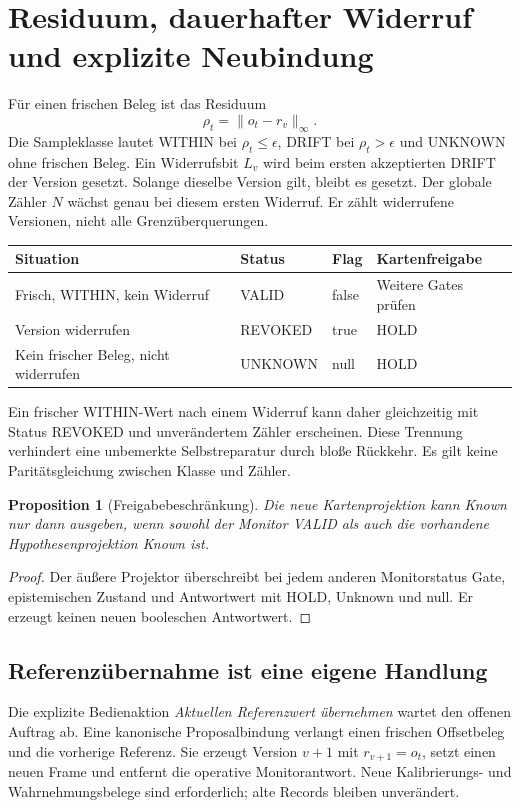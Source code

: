 \documentclass[11pt,a4paper]{article}
\newcommand{\nextsection}[2]{\clearpage{\color{accent}\small\textsf{#1}}\section{#2}}
\newtheorem{proposition}{Proposition}[section]
\begin{document}
\nextsection{53 / DRIFTMONITOR}{Residuum, dauerhafter Widerruf und explizite Neubindung}
Für einen frischen Beleg ist das Residuum
\[
 \rho_t=\|o_t-r_v\|_\infty.
\]
Die Sampleklasse lautet WITHIN bei $\rho_t\leq\epsilon$,
DRIFT bei $\rho_t>\epsilon$ und UNKNOWN ohne frischen Beleg.
Ein Widerrufsbit $L_v$ wird beim ersten akzeptierten DRIFT der
Version gesetzt. Solange dieselbe Version gilt, bleibt es gesetzt.
Der globale Zähler $N$ wächst genau bei diesem ersten Widerruf.
Er zählt widerrufene Versionen, nicht alle Grenzüberquerungen.

\begin{center}\begin{tabularx}{\linewidth}{@{}Ylll@{}}\toprule
Situation & Status & Flag & Kartenfreigabe\\\midrule
Frisch, WITHIN, kein Widerruf & VALID & false & Weitere Gates prüfen\\
Version widerrufen & REVOKED & true & HOLD\\
Kein frischer Beleg, nicht widerrufen & UNKNOWN & null & HOLD\\\bottomrule
\end{tabularx}\end{center}

Ein frischer WITHIN-Wert nach einem Widerruf kann daher gleichzeitig
mit Status REVOKED und unverändertem Zähler erscheinen. Diese
Trennung verhindert eine unbemerkte Selbstreparatur durch bloße
Rückkehr. Es gilt keine Paritätsgleichung zwischen Klasse und Zähler.

\begin{proposition}[Freigabebeschränkung]
Die neue Kartenprojektion kann Known nur dann ausgeben, wenn sowohl
der Monitor VALID als auch die vorhandene Hypothesenprojektion Known ist.
\end{proposition}
\begin{proof}
Der äußere Projektor überschreibt bei jedem anderen Monitorstatus
Gate, epistemischen Zustand und Antwortwert mit HOLD, Unknown und null.
Er erzeugt keinen neuen booleschen Antwortwert.
\end{proof}

\subsection{Referenzübernahme ist eine eigene Handlung}
Die explizite Bedienaktion \emph{Aktuellen Referenzwert übernehmen}
wartet den offenen Auftrag ab. Eine kanonische Proposalbindung
verlangt einen frischen Offsetbeleg und die vorherige Referenz.
Sie erzeugt Version $v+1$ mit $r_{v+1}=o_t$, setzt einen neuen Frame
und entfernt die operative Monitorantwort. Neue Kalibrierungs- und
Wahrnehmungsbelege sind erforderlich; alte Records bleiben unverändert.
\end{document}
